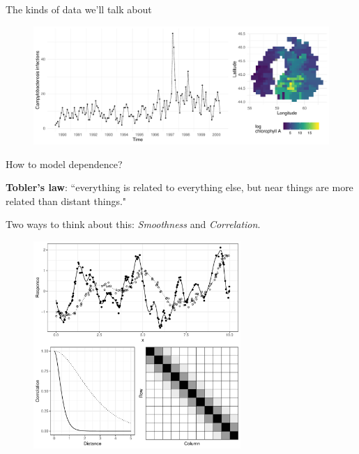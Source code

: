 \documentclass{beamer}
\begin{document}
\begin{frame}{The kinds of data we'll talk about}
  \begin{figure}[h]
    \begin{center}
      \includegraphics[width=\textwidth]{figures/ex_data.pdf}
    \end{center}
  \end{figure}
\end{frame}


\begin{frame}{How to model dependence?} 

\textbf{Tobler's law}: ``everything is related to everything else, but near things are more related than distant things."

Two ways to think about this: \textit{Smoothness} and \textit{Correlation}. 

  \begin{figure}[h]
    \begin{center}
      \includegraphics[width=0.7\textwidth, trim={0 9cm 0 0}, clip]{figures/smooth_corr.pdf}
    \end{center}
  \end{figure}

\end{frame}
\end{document}

